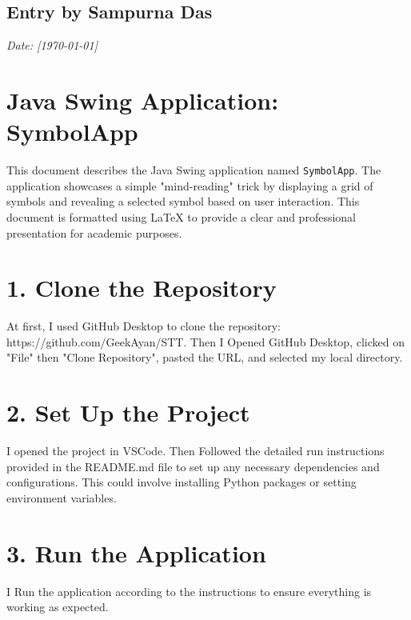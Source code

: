 \documentclass[12pt, a4paper]{article}
\begin{document}
\newpage
{}
\vspace{-2cm}
\subsection*{Entry by Sampurna Das}
\textit{Date: [\today]}\\
\section*{Java Swing Application: SymbolApp}
This document describes the Java Swing application named \texttt{SymbolApp}. The application showcases a simple "mind-reading" trick by displaying a grid of symbols and revealing a selected symbol based on user interaction. This document is formatted using LaTeX to provide a clear and professional presentation for academic purposes.

\section*{ 1. Clone the Repository}
At first, I used GitHub Desktop to clone the repository: https://github.com/GeekAyan/STT.
Then I Opened GitHub Desktop, clicked on "File" then "Clone Repository", pasted the URL, and selected my local directory.

\section*{  2. Set Up the Project}
I opened the project in VSCode.
Then Followed the detailed run instructions provided in the README.md file to set up any necessary dependencies and configurations. This could involve installing Python packages or setting environment variables.

\newpage
{}
\vspace{-2cm}

\section*{ 3. Run the Application}
I Run the application according to the instructions to ensure everything is working as expected.
\end{document}
